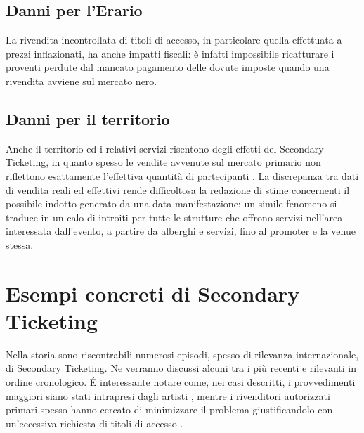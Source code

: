 \subsection{Danni per l'Erario}
La rivendita incontrollata di titoli di accesso, in particolare quella effettuata a prezzi inflazionati, ha anche impatti fiscali: è infatti impossibile ricatturare i proventi perdute dal mancato pagamento delle dovute imposte quando una rivendita avviene sul mercato nero. 

\subsection{Danni per il territorio}
Anche il territorio ed i relativi servizi risentono degli effetti del Secondary Ticketing, in quanto spesso le vendite avvenute sul mercato primario non riflettono esattamente l'effettiva quantità di partecipanti \cite{happel2009eight}. La discrepanza tra dati di vendita reali ed effettivi rende difficoltosa la redazione di stime concernenti il possibile indotto generato da una data manifestazione: un simile fenomeno si traduce in un calo di introiti per tutte le strutture che offrono servizi nell'area interessata dall'evento, a partire da alberghi e servizi, fino al promoter e la venue stessa.  

\section{Esempi concreti di Secondary Ticketing}
Nella storia sono riscontrabili numerosi episodi, spesso di rilevanza internazionale, di Secondary Ticketing. Ne verranno discussi alcuni tra i più recenti e rilevanti in ordine cronologico.
\'E interessante notare come, nei casi descritti, i provvedimenti maggiori siano stati intrapresi dagli artisti \cite{porcello2018fixed}, mentre i rivenditori autorizzati primari spesso hanno cercato di minimizzare il problema giustificandolo con un'eccessiva richiesta di titoli di accesso \cite{fortunato2011dancing}.
 
